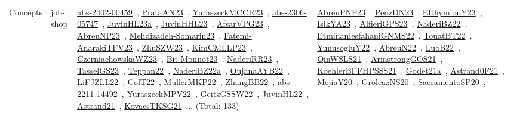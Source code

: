 {\begin{longtable}{lp{3cm}>{\raggedright\arraybackslash}p{6cm}>{\raggedright\arraybackslash}p{6cm}>{\raggedright\arraybackslash}p{8cm}}
Concepts & job-shop & \href{../works/abs-2402-00459.pdf}{abs-2402-00459}~\cite{abs-2402-00459}, \href{../works/PrataAN23.pdf}{PrataAN23}~\cite{PrataAN23}, \href{../works/YuraszeckMCCR23.pdf}{YuraszeckMCCR23}~\cite{YuraszeckMCCR23}, \href{../works/abs-2306-05747.pdf}{abs-2306-05747}~\cite{abs-2306-05747}, \href{../works/JuvinHL23a.pdf}{JuvinHL23a}~\cite{JuvinHL23a}, \href{../works/JuvinHHL23.pdf}{JuvinHHL23}~\cite{JuvinHHL23}, \href{../works/AfsarVPG23.pdf}{AfsarVPG23}~\cite{AfsarVPG23}, \href{../works/AbreuNP23.pdf}{AbreuNP23}~\cite{AbreuNP23}, \href{../works/Mehdizadeh-Somarin23.pdf}{Mehdizadeh-Somarin23}~\cite{Mehdizadeh-Somarin23}, \href{../works/Fatemi-AnarakiTFV23.pdf}{Fatemi-AnarakiTFV23}~\cite{Fatemi-AnarakiTFV23}, \href{../works/ZhuSZW23.pdf}{ZhuSZW23}~\cite{ZhuSZW23}, \href{../works/KimCMLLP23.pdf}{KimCMLLP23}~\cite{KimCMLLP23}, \href{../works/CzerniachowskaWZ23.pdf}{CzerniachowskaWZ23}~\cite{CzerniachowskaWZ23}, \href{../works/Bit-Monnot23.pdf}{Bit-Monnot23}~\cite{Bit-Monnot23}, \href{../works/NaderiRR23.pdf}{NaderiRR23}~\cite{NaderiRR23}, \href{../works/TasselGS23.pdf}{TasselGS23}~\cite{TasselGS23}, \href{../works/Teppan22.pdf}{Teppan22}~\cite{Teppan22}, \href{../works/NaderiBZ22a.pdf}{NaderiBZ22a}~\cite{NaderiBZ22a}, \href{../works/OujanaAYB22.pdf}{OujanaAYB22}~\cite{OujanaAYB22}, \href{../works/LiFJZLL22.pdf}{LiFJZLL22}~\cite{LiFJZLL22}, \href{../works/ColT22.pdf}{ColT22}~\cite{ColT22}, \href{../works/MullerMKP22.pdf}{MullerMKP22}~\cite{MullerMKP22}, \href{../works/ZhangBB22.pdf}{ZhangBB22}~\cite{ZhangBB22}, \href{../works/abs-2211-14492.pdf}{abs-2211-14492}~\cite{abs-2211-14492}, \href{../works/YuraszeckMPV22.pdf}{YuraszeckMPV22}~\cite{YuraszeckMPV22}, \href{../works/GeitzGSSW22.pdf}{GeitzGSSW22}~\cite{GeitzGSSW22}, \href{../works/JuvinHL22.pdf}{JuvinHL22}~\cite{JuvinHL22}, \href{../works/Astrand21.pdf}{Astrand21}~\cite{Astrand21}, \href{../works/KovacsTKSG21.pdf}{KovacsTKSG21}~\cite{KovacsTKSG21}... (Total: 133) & \href{../works/AbreuPNF23.pdf}{AbreuPNF23}~\cite{AbreuPNF23}, \href{../works/PenzDN23.pdf}{PenzDN23}~\cite{PenzDN23}, \href{../works/EfthymiouY23.pdf}{EfthymiouY23}~\cite{EfthymiouY23}, \href{../works/IsikYA23.pdf}{IsikYA23}~\cite{IsikYA23}, \href{../works/AlfieriGPS23.pdf}{AlfieriGPS23}~\cite{AlfieriGPS23}, \href{../works/NaderiBZ22.pdf}{NaderiBZ22}~\cite{NaderiBZ22}, \href{../works/EtminaniesfahaniGNMS22.pdf}{EtminaniesfahaniGNMS22}~\cite{EtminaniesfahaniGNMS22}, \href{../works/TouatBT22.pdf}{TouatBT22}~\cite{TouatBT22}, \href{../works/YunusogluY22.pdf}{YunusogluY22}~\cite{YunusogluY22}, \href{../works/AbreuN22.pdf}{AbreuN22}~\cite{AbreuN22}, \href{../works/LuoB22.pdf}{LuoB22}~\cite{LuoB22}, \href{../works/QinWSLS21.pdf}{QinWSLS21}~\cite{QinWSLS21}, \href{../works/ArmstrongGOS21.pdf}{ArmstrongGOS21}~\cite{ArmstrongGOS21}, \href{../works/KoehlerBFFHPSSS21.pdf}{KoehlerBFFHPSSS21}~\cite{KoehlerBFFHPSSS21}, \href{../works/Godet21a.pdf}{Godet21a}~\cite{Godet21a}, \href{../works/Astrand0F21.pdf}{Astrand0F21}~\cite{Astrand0F21}, \href{../works/MejiaY20.pdf}{MejiaY20}~\cite{MejiaY20}, \href{../works/GroleazNS20.pdf}{GroleazNS20}~\cite{GroleazNS20}, \href{../works/SacramentoSP20.pdf}{SacramentoSP20}~\cite{SacramentoSP20}, 
\end{longtable}}
